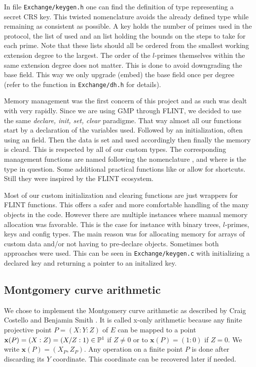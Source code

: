 \documentclass[../main.tex]{subfiles}
\begin{document}
In file \texttt{Exchange/keygen.h} one can find the definition of type  representing a secret CRS key.
This twisted nomenclature avoids the already defined  type while remaining as consistent as possible.
A key holds the number of primes used in the protocol, the list of  used and an  list holding the bounds on the steps to take for each prime.
Note that these lists should all be ordered from the smallest working extension degree to the largest.
The order of the $l$-primes themselves within the same extension degree does not matter.
This is done to avoid downgrading the base field.
This way we only upgrade (embed) the base field once per degree (refer to the  function  in \texttt{Exchange/dh.h} for details).

Memory management was the first concern of this project and as such was dealt with very rapidly.
Since we are using GMP through FLINT, we decided to use the same \textit{declare, init, set, clear} paradigme.
That way almost all our functions start by a declaration of the variables used.
Followed by an initialization, often using an  field.
Then the data is set and used accordingly then finally the memory is cleard.
This is respected by all of our custom types.
The corresponding management functions are named following the nomenclature ,  and  where \tF{*} is the type in question.
Some additional practical functions like  or  allow for shortcuts.
Still they were inspired by the FLINT ecosystem.

Most of our custom initialization and clearing functions are just wrappers for FLINT functions.
This offers a safer and more comfortable handling of the many objects in the code.
However there are multiple instances where manual memory allocation was favorable.
This is the case for instance with binary trees, $l$-primes, keys and config types.
The main reason was for allocating memory for arrays of custom data and/or not having to pre-declare objects.
Sometimes both approaches were used.
This can be seen in \texttt{Exchange/keygen.c} with  initializing a declared key and  returning a pointer to an initalized key.

\subsection{Montgomery curve arithmetic}

\newcommand{\x}{\textbf{x}}
\newcommand{\funct}[1]{\texttt{\detokenize{#1}}}
We chose to implement  the Montgomery curve arithmetic as described by Craig Costello and Benjamin Smith \cite{}. 
It is called x-only arithmetic because any finite projective point $P = (X:Y:Z)$ of $E$ can be mapped to a point $\x(P)=(X:Z)=(X/Z:1)\in\PP^1$ if $Z\neq0$ or to $\x(P)=(1:0)$ if $Z=0$. We write $\x(P)=(X_P, Z_P)$.
Any operation on a finite point $P$ is done after discarding its $Y$ coordinate. This coordinate can be recovered later if needed.
\end{document}
